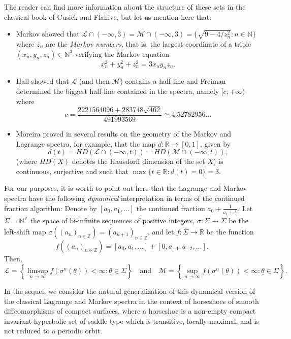 \documentclass[12pt]{amsart}
\theoremstyle{plain} %
\theoremstyle{definition} %
\numberwithin{equation}{section}
\begin{document}
The reader can find more information about the structure of these sets in the classical book \cite{CF} of Cusick and Flahive, but let us mention here that:
\begin{itemize}
\item Markov showed that $\mathcal{L}\cap(-\infty, 3)=\mathcal{M}\cap(-\infty, 3)=\{\sqrt{9-4/z_n^2}:n\in \mathbb{N}\}$ where $z_n$ are the \emph{Markov numbers}, that is, the largest coordinate of a triple $(x_n,y_n,z_n)\in \mathbb{N}^3$ verifying the Markov equation 
$$x_n^2+y_n^2+z_n^2=3x_ny_nz_n.$$
\item Hall showed that $\mathcal{L}$ (and then $\mathcal{M}$) contains a half-line and Freiman determined the biggest half-line contained in the spectra, namely $[c,+\infty)$ where 
$$c=\frac{2221564096+283748\sqrt{462}}{491993569}\simeq 4.52782956\dots$$ 
\item Moreira proved in \cite{M3} several results on the geometry of the Markov and Lagrange spectra, for example, that the map $d:\mathbb{R} \rightarrow [0,1]$, given by
$$d(t)=HD(\mathcal{L}\cap(-\infty,t))= HD(\mathcal{M}\cap(-\infty,t)),$$
(where $HD(X)$ denotes the Hausdorff dimension of the set $X$) is continuous, surjective and such that $\max\{t\in\mathbb{R}:d(t)=0\}=3.$
\end{itemize}

For our purposes, it is worth to point out here that the Lagrange and Markov spectra have the following \emph{dynamical} interpretation in terms of the continued fraction algorithm: Denote by $[a_0,a_1,\dots]$ the continued fraction $a_0+\frac{1}{a_1+\frac{1}{\ddots}}$. Let $\Sigma=\mathbb{N}^{\mathbb{Z}}$ the space of bi-infinite sequences of positive integers, $\sigma:\Sigma\to\Sigma$ be the left-shift map $\sigma((a_n)_{n\in\mathbb{Z}}) = (a_{n+1})_{n\in\mathbb{Z}}$, and let $f:\Sigma\to\mathbb{R}$ be the function
$$f((a_n)_{n\in\mathbb{Z}}) = [a_0, a_1,\dots] + [0, a_{-1}, a_{-2},\dots].$$
Then, 
$$\mathcal{L}=\left\{\limsup_{n\to\infty}f(\sigma^n(\underline{\theta}))<\infty:\underline{\theta}\in\Sigma\right\} \quad \textrm{and} \quad \mathcal{M}= \left\{\sup_{n\to\infty}f(\sigma^n(\underline{\theta}))<\infty:\underline{\theta}\in\Sigma\right\}.$$

In the sequel, we consider the natural generalization of this dynamical version of the classical Lagrange and Markov spectra in the context of horseshoes of smooth diffeomorphisms of compact surfaces, where a horseshoe is a non-empty compact invariant hyperbolic set of saddle type which is transitive, locally maximal, and is not reduced to a periodic orbit.
\end{document}
